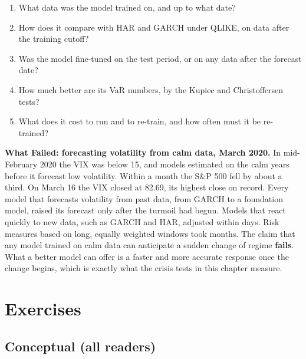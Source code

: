 \begin{enumerate}
  \item What data was the model trained on, and up to what date?
  \item How does it compare with HAR and GARCH under QLIKE, on data after the training cutoff?
  \item Was the model fine-tuned on the test period, or on any data after the forecast date?
  \item How much better are its VaR numbers, by the Kupiec and Christoffersen tests?
  \item What does it cost to run and to re-train, and how often must it be re-trained?
\end{enumerate}

\begin{callout}
\textbf{What Failed: forecasting volatility from calm data, March 2020.} In mid-February 2020 the VIX was below 15, and models estimated on the calm years before it forecast low volatility. Within a month the S\&P 500 fell by about a third. On March 16 the VIX closed at 82.69, its highest close on record. Every model that forecasts volatility from past data, from GARCH to a foundation model, raised its forecast only after the turmoil had begun. Models that react quickly to new data, such as GARCH and HAR, adjusted within days. Risk measures based on long, equally weighted windows took months. The claim that any model trained on calm data can anticipate a sudden change of regime \textbf{fails}. What a better model can offer is a faster and more accurate response once the change begins, which is exactly what the crisis tests in this chapter measure.
\end{callout}

\section*{Exercises}

\subsection*{Conceptual (all readers)}

